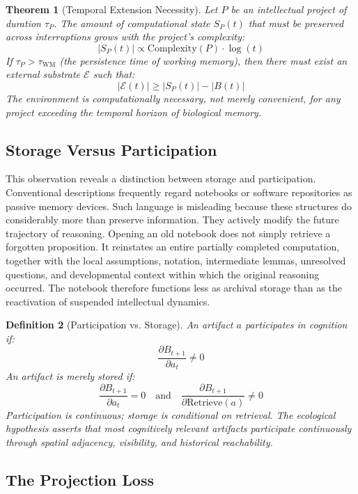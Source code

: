 \documentclass[12pt,oneside]{article}
\newtheorem{definition}{Definition}[section]
\newtheorem{theorem}[definition]{Theorem}
\theoremstyle{remark}
\begin{document}
\begin{theorem}[Temporal Extension Necessity]
Let \(P\) be an intellectual project of duration \(\tau_P\). The amount of computational state \(S_P(t)\) that must be preserved across interruptions grows with the project's complexity:
\[
|S_P(t)| \propto \text{Complexity}(P) \cdot \log(t)
\]
If \(\tau_P > \tau_{\text{WM}}\) (the persistence time of working memory), then there must exist an external substrate \(\mathcal{E}\) such that:
\[
|\mathcal{E}(t)| \geq |S_P(t)| - |B(t)|
\]
The environment is computationally necessary, not merely convenient, for any project exceeding the temporal horizon of biological memory.
\end{theorem}

\subsection{Storage Versus Participation}

This observation reveals a distinction between storage and participation. Conventional descriptions frequently regard notebooks or software repositories as passive memory devices. Such language is misleading because these structures do considerably more than preserve information. They actively modify the future trajectory of reasoning. Opening an old notebook does not simply retrieve a forgotten proposition. It reinstates an entire partially completed computation, together with the local assumptions, notation, intermediate lemmas, unresolved questions, and developmental context within which the original reasoning occurred. The notebook therefore functions less as archival storage than as the reactivation of suspended intellectual dynamics.

\begin{definition}[Participation vs. Storage]
An artifact \(a\) participates in cognition if:
\[
\frac{\partial B_{t+1}}{\partial a_t} \neq 0
\]
An artifact is merely stored if:
\[
\frac{\partial B_{t+1}}{\partial a_t} = 0 \quad \text{and} \quad \frac{\partial B_{t+1}}{\partial \text{Retrieve}(a)} \neq 0
\]
Participation is continuous; storage is conditional on retrieval. The ecological hypothesis asserts that most cognitively relevant artifacts participate continuously through spatial adjacency, visibility, and historical reachability.
\end{definition}

\subsection{The Projection Loss}
\end{document}
